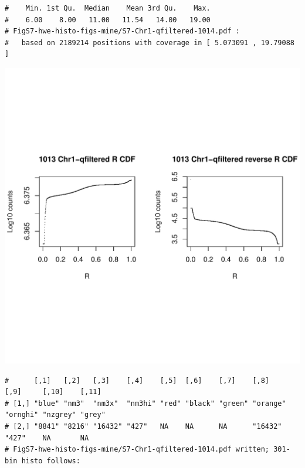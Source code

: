 \documentclass{article}\usepackage[]{graphicx}\usepackage[]{color}
\makeatletter
\def\maxwidth{ %
  \ifdim\Gin@nat@width>\linewidth
    \linewidth
  \else
    \Gin@nat@width
  \fi
}
\newenvironment{kframe}{%
 \def\at@end@of@kframe{}%
 \ifinner\ifhmode%
  \def\at@end@of@kframe{\end{minipage}}%
  \begin{minipage}{\columnwidth}%
 \fi\fi%
 \def\FrameCommand##1{\hskip\@totalleftmargin \hskip-\fboxsep
 \colorbox{shadecolor}{##1}\hskip-\fboxsep
     \hskip-\linewidth \hskip-\@totalleftmargin \hskip\columnwidth}%
 \MakeFramed {\advance\hsize-\width
   \@totalleftmargin\z@ \linewidth\hsize
   \@setminipage}}%
 {\par\unskip\endMakeFramed%
 \at@end@of@kframe}
\newenvironment{knitrout}{}{} %
\makeatother
\begin{document}
\begin{knitrout}
\begin{kframe}
\begin{verbatim}
#    Min. 1st Qu.  Median    Mean 3rd Qu.    Max. 
#    6.00    8.00   11.00   11.54   14.00   19.00 
# FigS7-hwe-histo-figs-mine/S7-Chr1-qfiltered-1014.pdf :
#   based on 2189214 positions with coverage in [ 5.073091 , 19.79088 ]
\end{verbatim}
\end{kframe}
\includegraphics[width=\maxwidth]{FigS7-hwe-histo-figs-knitr/unnamed-chunk-10-48} 
\begin{kframe}\begin{verbatim}
#      [,1]   [,2]   [,3]    [,4]    [,5]  [,6]    [,7]    [,8]     [,9]     [,10]    [,11] 
# [1,] "blue" "nm3"  "nm3x"  "nm3hi" "red" "black" "green" "orange" "ornghi" "nzgrey" "grey"
# [2,] "8841" "8216" "16432" "427"   NA    NA      NA      "16432"  "427"    NA       NA    
# FigS7-hwe-histo-figs-mine/S7-Chr1-qfiltered-1014.pdf written; 301-bin histo follows:
\end{verbatim}
\end{kframe}

\end{knitrout}
\end{document}
